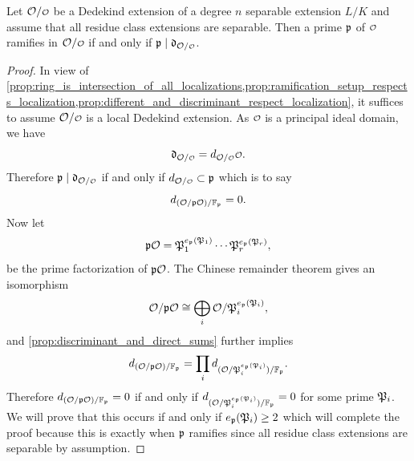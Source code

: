     \begin{theorem}\label{thm:ramifies_if_and_only_if_divides_the_discriminant}
      Let \(\mc{O}/\smc{O}\) be a Dedekind extension of a degree \(n\) separable extension \(L/K\) and assume that all residue class extensions are separable. Then a prime \(\mathfrak{p}\) of \(\smc{O}\) ramifies in \(\mc{O}/\smc{O}\) if and only if \(\mf{p} \mid \mf{d}_{\mc{O}/\smc{O}}\).
    \end{theorem}
    \begin{proof}
      In view of \cref{prop:ring_is_intersection_of_all_localizations,prop:ramification_setup_respects_localization,prop:different_and_discriminant_respect_localization}, it suffices to assume \(\mc{O}/\smc{O}\) is a local Dedekind extension. As \(\smc{O}\) is a principal ideal domain, we have
      \[
        \mf{d}_{\mc{O}/\smc{O}} = d_{\mc{O}/\smc{O}}\smc{O}.
      \]
      Therefore \(\mf{p} \mid \mf{d}_{\mc{O}/\smc{O}}\) if and only if \(d_{\mc{O}/\smc{O}} \subset \mf{p}\) which is to say
      \[
        d_{(\mathcal{O}/\mathfrak{p}\mathcal{O})/\mathbb{F}_{\mathfrak{p}}} = 0.
      \]
      Now let
      \[
        \mathfrak{p}\mathcal{O} = \mathfrak{P}_{1}^{e_{\mathfrak{p}}(\mathfrak{P}_{1})} \cdots \mathfrak{P}_{r}^{e_{\mathfrak{p}}(\mathfrak{P}_{r})},
      \]
      be the prime factorization of \(\mathfrak{p}\mathcal{O}\). The Chinese remainder theorem gives an isomorphism
      \[
        \mathcal{O}/\mathfrak{p}\mathcal{O} \cong \bigoplus_{i} \mathcal{O}/\mathfrak{P}_{i}^{e_{\mathfrak{p}}(\mathfrak{P}_{i})},
      \]
      and \cref{prop:discriminant_and_direct_sums} further implies
      \[
        d_{(\mathcal{O}/\mathfrak{p}\mathcal{O})/\mathbb{F}_{\mathfrak{p}}} = \prod_{i}d_{(\mathcal{O}/\mathfrak{P}_{i}^{e_{\mathfrak{p}}(\mathfrak{P}_{i})})/\mathbb{F}_{\mathfrak{p}}}.
      \]
      Therefore \(d_{(\mathcal{O}/\mathfrak{p}\mathcal{O})/\mathbb{F}_{\mathfrak{p}}} = 0\) if and only if \(d_{(\mathcal{O}/\mathfrak{P}_{i}^{e_{\mathfrak{p}}(\mathfrak{P}_{i})})/\mathbb{F}_{\mathfrak{p}}} = 0\) for some prime \(\mathfrak{P}_{i}\). We will prove that this occurs if and only if \(e_{\mathfrak{p}}(\mathfrak{P}_{i}) \ge 2\) which will complete the proof because this is exactly when \(\mathfrak{p}\) ramifies since all residue class extensions are separable by assumption.
      

\end{proof}
